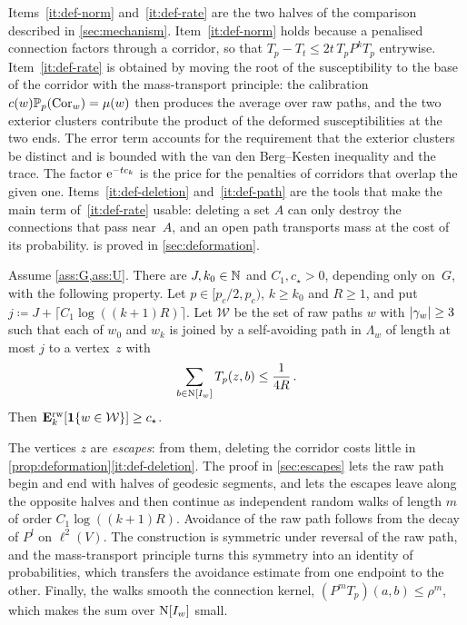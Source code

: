 Items~\ref{it:def-norm} and~\ref{it:def-rate} are the two halves of the comparison described in
\cref{sec:mechanism}. Item~\ref{it:def-norm} holds because a penalised connection factors through a
corridor, so that $T_p-T_t\le2t\,T_pP^kT_p$ entrywise. Item~\ref{it:def-rate} is obtained by moving
the root of the susceptibility to the base of the corridor with the mass-transport principle: the
calibration $c(w)\mathbb P_p(\mathrm{Cor}_w)=\mu(w)$ then produces the average over raw paths, and the two exterior
clusters contribute the product of the deformed susceptibilities at the two ends. The error term
accounts for the requirement that the exterior clusters be distinct and is bounded with the
van den Berg--Kesten inequality and the trace. The factor $\mathrm{e}^{-tc_k}$ is the price for the penalties
of corridors that overlap the given one. Items~\ref{it:def-deletion} and~\ref{it:def-path} are the
tools that make the main term of~\ref{it:def-rate} usable: deleting a set $A$ can only destroy the
connections that pass near~$A$, and an open path transports mass at the cost of its probability.
 is proved in \cref{sec:deformation}.

\begin{proposition}\label{prop:escapes}
Assume \cref{ass:G,ass:U}. There are $J,k_0\in\mathbb N$ and $C_1,c_\star>0$, depending only on~$G$, with the
following property. Let $p\in[p_c/2,p_c)$, $k\ge k_0$ and $R\ge1$, and put
$j\coloneqq J+\lceil C_1\log((k+1)R)\rceil$. Let $\mathcal W$ be the set of raw paths $w$ with
$\lvert\gamma_w\rvert\ge3$ such that each of $w_0$ and $w_k$ is joined by a self-avoiding path in
$\Lambda_w$ of length at most $j$ to a vertex~$z$ with
\begin{equation*}
  \sum_{b\in\mathrm{N}[I_w]}T_p(z,b)\le\frac{1}{4R}\,.
\end{equation*}
Then $\mathbf{E}^{\mathrm{rw}}_{k}[\mathbf{1}\{w\in\mathcal W\}]\ge c_\star$.
\end{proposition}

The vertices $z$ are \emph{escapes}: from them, deleting the corridor costs little in
\cref{prop:deformation}\ref{it:def-deletion}. The proof in \cref{sec:escapes} lets the raw path begin
and end with halves of geodesic segments, and lets the escapes leave along the opposite halves and then
continue as independent random walks of length $m$ of order $C_1\log((k+1)R)$. Avoidance of the raw
path follows from the decay of $P^l$ on $\ell^2(V)$. The construction is symmetric under reversal of the
raw path, and the mass-transport principle turns this symmetry into an identity of probabilities, which
transfers the avoidance estimate from one endpoint to the other. Finally, the walks smooth the
connection kernel, $(P^mT_p)(a,b)\le\rho^m$, which makes the sum over $\mathrm{N}[I_w]$ small.

